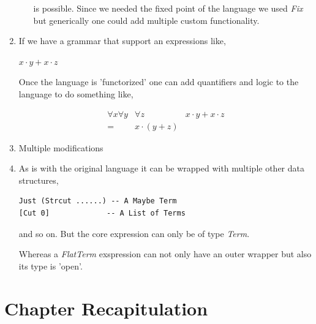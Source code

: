 \documentclass[thesis-solanki.tex]{subfiles}
\begin{document}
\begin{enumerate}
\begin{enumerate}
is possible. Since we needed the fixed point of the language we used \textit{Fix} but generically one could add multiple custom 
functionality.  

\end{enumerate}  


\item If we have a grammar that support an expressions like,


\begin{math}
x \cdot y + x \cdot z
\end{math} 

Once the language is 'functorized' one can add quantifiers and logic to the language to do something like,


\begin{align}
  \forall x \forall y & \forall z & x \cdot y + x \cdot z \\
  = & x \cdot (y + z)	
\end{align}

\item Multiple modifications

\item As is with the original language it can be wrapped with multiple other data structures,

\begin{verbatim}
Just (Strcut ......) -- A Maybe Term
[Cut 0]				-- A List of Terms
\end{verbatim} 
and so on. But the core expression can only be of type \textit{Term}. 

Whereas a \textit{FlatTerm} exspression can not only have an outer wrapper but also its type is 'open'.   



\end{enumerate}



\section{Chapter Recapitulation}

\ifMain
\begin{scope}
  \nolinenumbers
  \enotesize
  \par
  \begin{singlespace}
  \setlength{\parskip}{12pt plus 2pt minus 1pt}
  \theendnotes
  \par
  \end{singlespace}
\end{scope}
\fi
\end{document}
